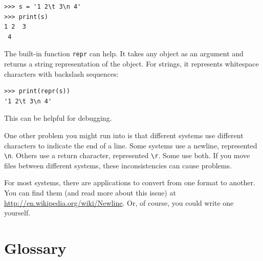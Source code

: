 \documentclass[10pt]{book}
\begin{document}
\begin{verbatim}
>>> s = '1 2\t 3\n 4'
>>> print(s)
1 2	 3
 4
\end{verbatim}

The built-in function {\tt repr} can help.  It takes any object as an
argument and returns a string representation of the object.  For
strings, it represents whitespace
characters with backslash sequences:

\begin{verbatim}
>>> print(repr(s))
'1 2\t 3\n 4'
\end{verbatim}

This can be helpful for debugging.

One other problem you might run into is that different systems
use different characters to indicate the end of a line.  Some
systems use a newline, represented \verb"\n".  Others use
a return character, represented \verb"\r".  Some use both.
If you move files between different systems, these inconsistencies
can cause problems.

For most systems, there are applications to convert from one
format to another.  You can find them (and read more about this
issue) at \url{http://en.wikipedia.org/wiki/Newline}.  Or, of course, you
could write one yourself.


\section{Glossary}
\end{document}
